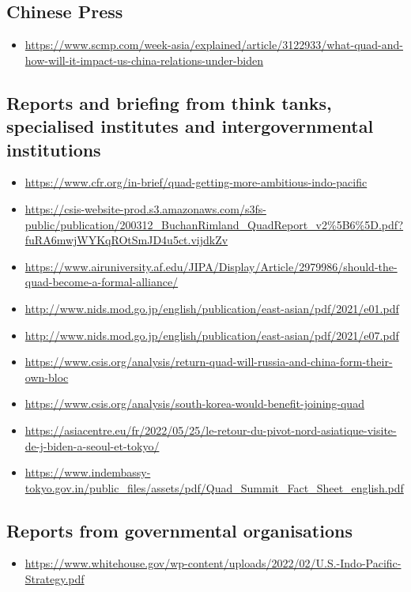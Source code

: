 \documentclass[11pt,a4paper]{article}
\begin{document}
\subsection*{Chinese Press}
  \begin{itemize}[leftmargin=1.3em,itemsep=.18em,topsep=.25em]
    \item \url{https://www.scmp.com/week-asia/explained/article/3122933/what-quad-and-how-will-it-impact-us-china-relations-under-biden}
  \end{itemize}
\subsection*{Reports and briefing from think tanks, specialised institutes and intergovernmental institutions}
  \begin{itemize}[leftmargin=1.3em,itemsep=.18em,topsep=.25em]
    \item \url{https://www.cfr.org/in-brief/quad-getting-more-ambitious-indo-pacific}
    \item \url{https://csis-website-prod.s3.amazonaws.com/s3fs-public/publication/200312_BuchanRimland_QuadReport_v2\%5B6\%5D.pdf?fuRA6mwjWYKqROtSmJD4u5ct.vijdkZv}
    \item \url{https://www.airuniversity.af.edu/JIPA/Display/Article/2979986/should-the-quad-become-a-formal-alliance/}
    \item \url{http://www.nids.mod.go.jp/english/publication/east-asian/pdf/2021/e01.pdf}
    \item \url{http://www.nids.mod.go.jp/english/publication/east-asian/pdf/2021/e07.pdf}
    \item \url{https://www.csis.org/analysis/return-quad-will-russia-and-china-form-their-own-bloc}
    \item \url{https://www.csis.org/analysis/south-korea-would-benefit-joining-quad}
    \item \url{https://asiacentre.eu/fr/2022/05/25/le-retour-du-pivot-nord-asiatique-visite-de-j-biden-a-seoul-et-tokyo/}
    \item \url{https://www.indembassy-tokyo.gov.in/public_files/assets/pdf/Quad_Summit_Fact_Sheet_english.pdf}
  \end{itemize}
\subsection*{Reports from governmental organisations}
  \begin{itemize}[leftmargin=1.3em,itemsep=.18em,topsep=.25em]
    \item \url{https://www.whitehouse.gov/wp-content/uploads/2022/02/U.S.-Indo-Pacific-Strategy.pdf}
  \end{itemize}
\end{document}
